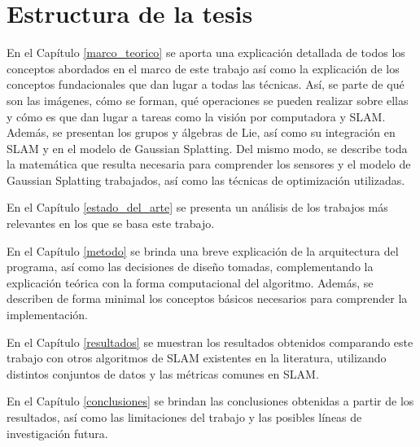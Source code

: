 \section{Estructura de la tesis}

En el Capítulo \ref{marco_teorico} se aporta una explicación detallada de todos los conceptos abordados en el marco de este trabajo así como la explicación de los conceptos fundacionales que dan lugar a todas las técnicas. Así, se parte de qué son las imágenes, cómo se forman, qué operaciones se pueden realizar sobre ellas y cómo es que dan lugar a tareas como la visión por computadora y SLAM. Además, se presentan los grupos y álgebras de Lie, así como su integración en SLAM y en el modelo de Gaussian Splatting. Del mismo modo, se describe toda la matemática que resulta necesaria para comprender los sensores y el modelo de Gaussian Splatting trabajados, así como las técnicas de optimización utilizadas.

En el Capítulo \ref{estado_del_arte} se presenta un análisis de los trabajos más relevantes en los que se basa este trabajo.

En el Capítulo \ref{metodo} se brinda una breve explicación de la arquitectura del programa, así como las decisiones de diseño tomadas, complementando la explicación teórica con la forma computacional del algoritmo. Además, se describen de forma minimal los conceptos básicos necesarios para comprender la implementación.

En el Capítulo \ref{resultados} se muestran los resultados obtenidos comparando este trabajo con otros algoritmos de SLAM existentes en la literatura, utilizando distintos conjuntos de datos y las métricas comunes en SLAM.

En el Capítulo \ref{conclusiones} se brindan las conclusiones obtenidas a partir de los resultados, así como las limitaciones del trabajo y las posibles líneas de investigación futura.
